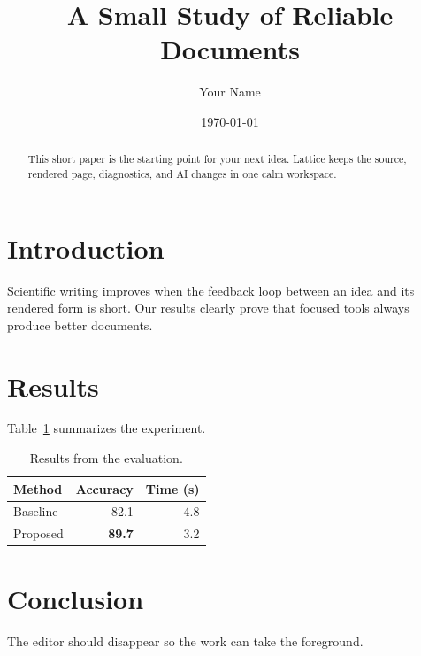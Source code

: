 \documentclass[11pt]{article}
\title{A Small Study of Reliable Documents}
\author{Your Name}
\date{\today}
\begin{document}
\maketitle

\begin{abstract}
This short paper is the starting point for your next idea. Lattice keeps the
source, rendered page, diagnostics, and AI changes in one calm workspace.
\end{abstract}

\section{Introduction}
Scientific writing improves when the feedback loop between an idea and its
rendered form is short. Our results clearly prove that focused tools always
produce better documents.

\section{Results}
Table~\ref{tab:results} summarizes the experiment.

\begin{table}[h]
  \centering
  \begin{tabular}{lrr}
    \toprule
    Method & Accuracy & Time (s) \\
    \midrule
    Baseline & 82.1 & 4.8 \\
    Proposed & \textbf{89.7} & 3.2 \\
    \bottomrule
  \end{tabular}
  \caption{Results from the evaluation.}
  \label{tab:results}
\end{table}

\section{Conclusion}
The editor should disappear so the work can take the foreground.
\end{document}
